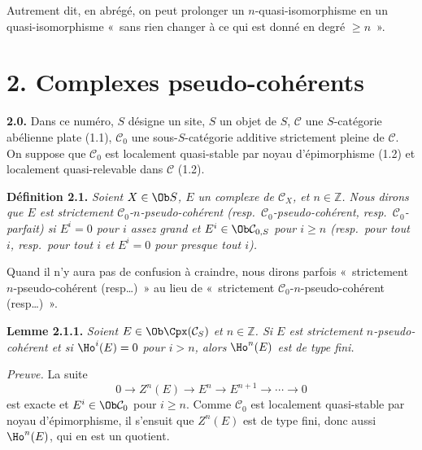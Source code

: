 Autrement dit, en abrégé, on peut prolonger un \(n\)-quasi-isomorphisme en un quasi-isomorphisme «~sans rien changer à ce qui est donné en degré \(\geq n\)~».

\section*{2. Complexes pseudo-cohérents}

\textbf{2.0.} Dans ce numéro, \(S\) désigne un site, \(S\) un objet de \(S\), \(\mathcal C\) une \(S\)-catégorie abélienne plate (1.1), \(\mathcal C_0\) une sous-\(S\)-catégorie additive strictement pleine de \(\mathcal C\). On suppose que \(\mathcal C_0\) est localement quasi-stable par noyau d'épimorphisme (1.2) et localement quasi-relevable dans \(\mathcal C\) (1.2).

\textbf{Définition 2.1.} \emph{Soient \(X\in\Ob S\), \(E\) un complexe de \(\mathcal C_X\), et \(n\in\mathbb Z\). Nous dirons que \(E\) est strictement \(\mathcal C_0\)-\(n\)-pseudo-cohérent (resp.\ \(\mathcal C_0\)-pseudo-cohérent, resp.\ \(\mathcal C_0\)-parfait) si \(E^i=0\) pour \(i\) assez grand et \(E^i\in\Ob\mathcal C_{0,S}\) pour \(i\geq n\) (resp.\ pour tout \(i\), resp.\ pour tout \(i\) et \(E^i=0\) pour presque tout \(i\)).}

Quand il n'y aura pas de confusion à craindre, nous dirons parfois «~strictement \(n\)-pseudo-cohérent (resp\dots)~» au lieu de «~strictement \(\mathcal C_0\)-\(n\)-pseudo-cohérent (resp\dots)~».

\textbf{Lemme 2.1.1.} \emph{Soient \(E\in\Ob\Cpx(\mathcal C_S)\) et \(n\in\mathbb Z\). Si \(E\) est strictement \(n\)-pseudo-cohérent et si \(\Ho^i(E)=0\) pour \(i>n\), alors \(\Ho^n(E)\) est de type fini.}

\emph{Preuve.} La suite
\[
  0\longrightarrow Z^n(E)\longrightarrow E^n\longrightarrow E^{n+1}\longrightarrow\cdots\longrightarrow 0
\]
est exacte et \(E^i\in\Ob\mathcal C_0\) pour \(i\geq n\). Comme \(\mathcal C_0\) est localement quasi-stable par noyau d'épimorphisme, il s'ensuit que \(Z^n(E)\) est de type fini, donc aussi \(\Ho^n(E)\), qui en est un quotient.

